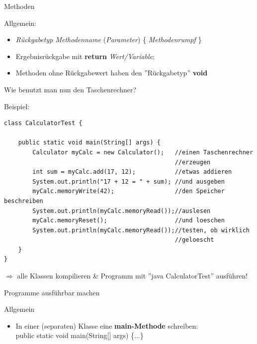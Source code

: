 \documentclass[18pt]{beamer}
\begin{document}
\begin{frame}{Methoden}
\begin{block}{Allgemein:}
\begin{itemize}
	\item \textit{Rückgabetyp Methodenname} (\textit{Parameter}) \{ \textit{Methodenrumpf} \}
	\item Ergebnisrückgabe mit \textbf{return} \textit{Wert/Variable};
	\item Methoden ohne Rückgabewert haben den ''Rückgabetyp'' \textbf{void}
\end{itemize}
\end{block}
\end{frame}

\begin{frame}[containsverbatim]{Wie benutzt man nun den Taschenrechner?}
\begin{exampleblock}{Beispiel:}
\begin{lstlisting}[basicstyle=\scriptsize]
class CalculatorTest {
	
	public static void main(String[] args) {
		Calculator myCalc = new Calculator();	//einen Taschenrechner 
												//erzeugen
		int sum = myCalc.add(17, 12);			//etwas addieren
		System.out.println("17 + 12 = " + sum);	//und ausgeben
		myCalc.memoryWrite(42);					//den Speicher beschreiben
		System.out.println(myCalc.memoryRead());//auslesen
		myCalc.memoryReset();					//und loeschen
		System.out.println(myCalc.memoryRead());//testen, ob wirklich 
												//geloescht
	}
}
\end{lstlisting}
\end{exampleblock}
\pause
$\Rightarrow$ alle Klassen kompilieren \& Programm mit ''java CalculatorTest'' ausführen!
\end{frame}

\begin{frame}{Programme ausführbar machen}
\begin{block}{Allgemein}
\begin{itemize}
	\item In einer (separaten) Klasse eine \textbf{main-Methode} schreiben:\\
		public static void main(String[] args) \{...\}
\end{itemize}
\end{block}
\end{frame}
\end{document}
